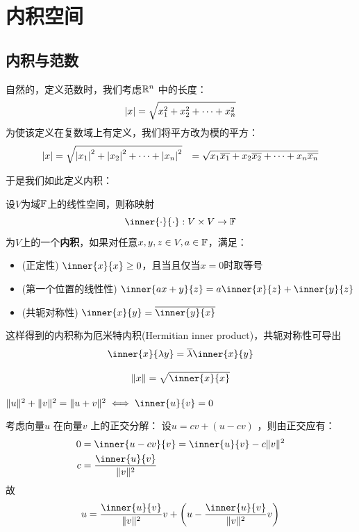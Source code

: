 \chapter{内积空间}
\section{内积与范数}

自然的，定义范数时，我们考虑\(\mathbb{R}^{n} \) 中的长度：\[
    \left|x\right| = \sqrt{x_1^2 + x_2^2 + \cdots + x_n^2}
\]
为使该定义在复数域上有定义，我们将平方改为模的平方：
\begin{align*}
    \left|x\right| &= \sqrt{\left|x_1\right|^2 + \left|x_2\right|^2 + \cdots + \left|x_n\right|^2}
    &= \sqrt{x_1 \overline{x_1} + x_2 \overline{x_2} + \cdots + x_n
    \overline{x_n}}
\end{align*}

于是我们如此定义内积：
\begin{definition}[内积]
    设\(V\)为域\(\mathbb{F}\)上的线性空间，则称映射
    \[
        \inner{\cdot}{\cdot} : V \times V \to \F
    \]
    为\(V\)上的一个\textbf{内积}，如果对任意\(x,y,z \in V, a \in \mathbb{F}\)，满足：
    \begin{itemize}
        \item (正定性) \(\inner{x}{x} \geq 0\)，且当且仅当\(x = 0\)时取等号
        \item (第一个位置的线性性) \(\inner{ax + y}{z} = a\inner{x}{z} + \inner{y}{z}\)
        \item (共轭对称性) \(\inner{x}{y} = \conj{\inner{y}{x}}\)
    \end{itemize}
\end{definition}

这样得到的内积称为厄米特内积(Hermitian inner product)，共轭对称性可导出\[
    \inner{x}{\lambda y} = \conj{\lambda} \inner{x}{y}
\]

\begin{definition}[范数]
    \[
        \norm{x} = \sqrt{\inner{x}{x}}
    \]
\end{definition}

\begin{theorem}[勾股定理]
    \(\norm{u}^{2} + \norm{v}^{2} = \norm{u+v}^{2} \iff \inner{u}{v} = 0\)
\end{theorem}

考虑向量\(u\) 在向量\(v\) 上的正交分解：
设\(u = cv + (u-cv)\) ，则由正交应有：
\begin{align*}
    0 &= \inner{u-cv}{v} = \inner{u}{v} - c\norm{v}^{2} \\
    c &= \frac{\inner{u}{v}}{\norm{v}^{2}}
\end{align*}
故\[
    u = \frac{\inner{u}{v}}{\norm{v}^{2}} v + \left(u -
    \frac{\inner{u}{v}}{\norm{v}^{2}} v\right)
\]

